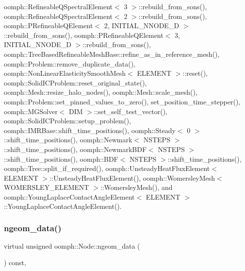 oomph\+::\+Refineable\+Q\+Spectral\+Element$<$ 3 $>$\+::rebuild\+\_\+from\+\_\+sons(), oomph\+::\+Refineable\+Q\+Spectral\+Element$<$ 2 $>$\+::rebuild\+\_\+from\+\_\+sons(), oomph\+::\+P\+Refineable\+Q\+Element$<$ 2, I\+N\+I\+T\+I\+A\+L\+\_\+\+N\+N\+O\+D\+E\+\_\+D $>$\+::rebuild\+\_\+from\+\_\+sons(), oomph\+::\+P\+Refineable\+Q\+Element$<$ 3, I\+N\+I\+T\+I\+A\+L\+\_\+\+N\+N\+O\+D\+E\+\_\+D $>$\+::rebuild\+\_\+from\+\_\+sons(), oomph\+::\+Tree\+Based\+Refineable\+Mesh\+Base\+::refine\+\_\+as\+\_\+in\+\_\+reference\+\_\+mesh(), oomph\+::\+Problem\+::remove\+\_\+duplicate\+\_\+data(), oomph\+::\+Non\+Linear\+Elasticity\+Smooth\+Mesh$<$ E\+L\+E\+M\+E\+N\+T $>$\+::reset(), oomph\+::\+Solid\+I\+C\+Problem\+::reset\+\_\+original\+\_\+state(), oomph\+::\+Mesh\+::resize\+\_\+halo\+\_\+nodes(), oomph\+::\+Mesh\+::scale\+\_\+mesh(), oomph\+::\+Problem\+::set\+\_\+pinned\+\_\+values\+\_\+to\+\_\+zero(), set\+\_\+position\+\_\+time\+\_\+stepper(), oomph\+::\+M\+G\+Solver$<$ D\+I\+M $>$\+::set\+\_\+self\+\_\+test\+\_\+vector(), oomph\+::\+Solid\+I\+C\+Problem\+::setup\+\_\+problem(), oomph\+::\+I\+M\+R\+Base\+::shift\+\_\+time\+\_\+positions(), oomph\+::\+Steady$<$ 0 $>$\+::shift\+\_\+time\+\_\+positions(), oomph\+::\+Newmark$<$ N\+S\+T\+E\+P\+S $>$\+::shift\+\_\+time\+\_\+positions(), oomph\+::\+Newmark\+B\+D\+F$<$ N\+S\+T\+E\+P\+S $>$\+::shift\+\_\+time\+\_\+positions(), oomph\+::\+B\+D\+F$<$ N\+S\+T\+E\+P\+S $>$\+::shift\+\_\+time\+\_\+positions(), oomph\+::\+Tree\+::split\+\_\+if\+\_\+required(), oomph\+::\+Unsteady\+Heat\+Flux\+Element$<$ E\+L\+E\+M\+E\+N\+T $>$\+::\+Unsteady\+Heat\+Flux\+Element(), oomph\+::\+Womersley\+Mesh$<$ W\+O\+M\+E\+R\+S\+L\+E\+Y\+\_\+\+E\+L\+E\+M\+E\+N\+T $>$\+::\+Womersley\+Mesh(), and oomph\+::\+Young\+Laplace\+Contact\+Angle\+Element$<$ E\+L\+E\+M\+E\+N\+T $>$\+::\+Young\+Laplace\+Contact\+Angle\+Element().

\mbox{\label{classoomph_1_1Node_ad20302b7992437075d3ca42390b39f24}} 
\subsubsection{\texorpdfstring{ngeom\+\_\+data()}{ngeom\_data()}}
{\footnotesize\ttfamily virtual unsigned oomph\+::\+Node\+::ngeom\+\_\+data (\begin{DoxyParamCaption}{ }\end{DoxyParamCaption}) const\hspace{0.3cm}{\ttfamily [inline]}, {\ttfamily [virtual]}}




